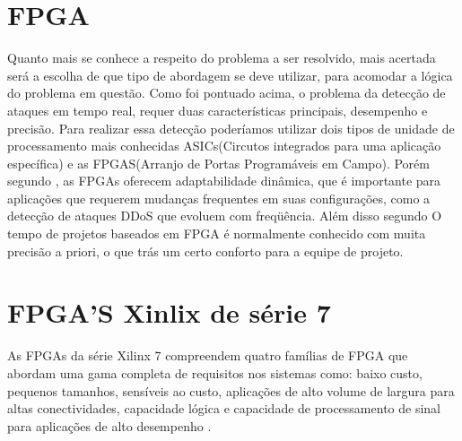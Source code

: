 \section{FPGA}
Quanto mais se conhece a respeito do problema a ser resolvido, mais acertada será a escolha de que tipo de abordagem se deve utilizar, para acomodar a lógica do problema em questão. Como foi pontuado acima, o problema da detecção de ataques em tempo real, requer duas características principais, desempenho e precisão. Para realizar essa detecção poderíamos utilizar dois tipos de unidade de processamento mais conhecidas ASICs(Circutos integrados para uma aplicação específica) e as FPGAS(Arranjo de Portas Programáveis em Campo). Porém segundo , as FPGAs oferecem adaptabilidade dinâmica, que é importante para aplicações que requerem mudanças frequentes em suas configurações, como a detecção de ataques DDoS que evoluem com freqüência. Além disso segundo  O tempo de projetos baseados em FPGA é normalmente conhecido com muita precisão a priori, o que trás um certo conforto para a equipe de projeto.




\section{FPGA'S Xinlix de série 7}
As FPGAs da série Xilinx 7 compreendem quatro famílias de FPGA que abordam uma gama completa de requisitos nos sistemas como: baixo custo, pequenos tamanhos, sensíveis ao custo, aplicações de alto volume de largura para altas conectividades, capacidade lógica e capacidade de processamento de sinal para aplicações de alto desempenho \cite{przybus2010xilinx}.

